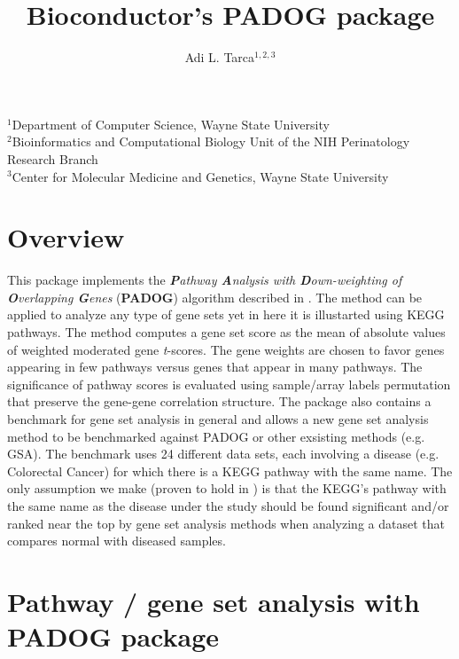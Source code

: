 \documentclass[11pt]{article}
\begin{document}
\title{\bf Bioconductor's PADOG package}
\author{Adi L. Tarca$^{1,2,3}$}

\maketitle

$^1$Department of Computer Science, Wayne State University\\
$^2$Bioinformatics and Computational Biology Unit of the NIH Perinatology Research Branch\\
$^3$Center for Molecular Medicine and Genetics, Wayne State University \\



\section{Overview}

This package implements the \emph{\textbf{P}athway \textbf{A}nalysis with \textbf{D}own-weighting of \textbf{O}verlapping \textbf{G}enes} (\textbf{PADOG})
 algorithm described in \cite{TarcaPADOG:2012}. The method can be applied to analyze any type of gene sets yet in here
 it is illustarted using KEGG pathways.
The method computes a gene set score as the mean of absolute values of weighted moderated gene
 \emph{t}-scores. The gene weights are chosen to favor genes appearing in few pathways versus genes
  that appear in many pathways. The significance of pathway scores is evaluated using sample/array 
  labels permutation that preserve the gene-gene correlation structure.
The package also contains a benchmark for gene set analysis in general and allows a new gene set 
analysis method to be benchmarked against PADOG or other exsisting methods (e.g. GSA).
The benchmark uses 24 different data sets, each involving a disease (e.g. Colorectal Cancer) for which there
is a KEGG pathway with the same name. The only assumption we make (proven to hold in \cite{TarcaPADOG:2012}) 
is that the KEGG's pathway with the same name as the disease under the study should be found significant 
and/or ranked near the top by gene set analysis methods when analyzing a dataset that compares normal 
with diseased samples.

\section{Pathway / gene set analysis with PADOG package}
\end{document}
